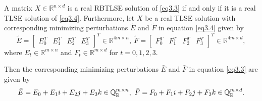 \documentclass[10pt,a4paper]{amsart}
\def \QR{\mathbb{Q}_\mathbb{R}}
\def \R{{\mathbb R}}
\def \i{\textit{\textbf{i}}}
\def \j{\textit{\textbf{j}}}
\def \k{\textit{\textbf{k}}}
\begin{document}
\begin{theorem}\label{thm3.1}
	A matrix $X \in \R^{n \times d}$ is a real RBTLSE solution of \eqref{eq3.3} if and only if it is a real TLSE solution of \eqref{eq3.4}. Furthermore, let $X$ be a real TLSE solution with corresponding minimizing perturbations $\widetilde{E}$ and $\widetilde{F}$ in equation \eqref{eq3.4} given by
	\begin{equation*}
		\widetilde{E} = \begin{bmatrix} E_0^T & E_1^T & E_2^T & E_3^T \end{bmatrix}^T \in \R^{4m \times n}, ~
		\widetilde{F} = \begin{bmatrix} F_0^T & F_1^T & F_2^T & F_3^T \end{bmatrix}^T \in \R^{4m \times d},
	\end{equation*}
where $E_t \in \R^{m \times n}$ and $F_t \in \R^{m \times d}$ for $t=0,1,2,3$.

Then the corresponding minimizing perturbations $\bar{E}$ and $\bar{F}$ in equation \eqref{eq3.3} are given by
\begin{equation*}
	\bar{E} = E_0 + E_1\i + E_2\j + E_3\k \in \QR^{m \times n}, ~
	\bar{F} = F_0 + F_1\i + F_2\j + F_3\k \in \QR^{m \times d}.
\end{equation*}
\end{theorem}
\end{document}
